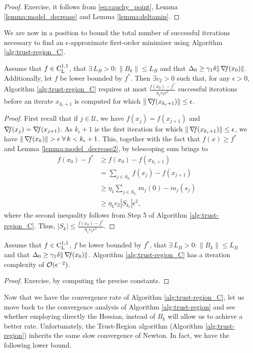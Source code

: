 \documentclass[10pt,a4paper]{article}
\begin{document}
\begin{proof}
	Exercise, it follows from \eqref{eq:cauchy_point}, Lemma \ref{lemma:model_decrease} and Lemma \ref{lemma:deltamin}.
\end{proof}

\noindent We are now in a position to bound the total number of successful iterations necessary to find an $\epsilon$-approximate first-order minimizer using Algorithm \ref{alg:trust-region_C}.

\begin{lemma}
	Assume that $f\in \mathord{\mathrm{C^{1,1}_{L}}}$, that $\exists\, L_B>0: \|B_k\| \leq L_B$ and that $\Delta_0\geq \gamma_1 \delta \|\operatorname*{\mathit{\nabla \!f}}(x_0)\|$. Additionally, let $f$ be lower bounded by $f^*$. Then $\exists c_2>0$ such that, for any $\epsilon > 0$, Algorithm \ref{alg:trust-region_C} requires at most $\frac{f(x_0) - f^*}{\eta_1c_2\epsilon^2}$
	successful iterations before an iterate $x_{k_\epsilon+1}$ is computed for which $\|\operatorname*{\mathit{\nabla \!f}}(x_{k_\epsilon+1})\| \leq \epsilon$.
\end{lemma}
\begin{proof}
First recall that if $j\in \mathcal{U}$, we have $f(x_j) = f(x_{j+1})$ and $\operatorname*{\mathit{\nabla \!f}}(x_j)=\operatorname*{\mathit{\nabla \!f}}(x_{j+1})$. As $k_\epsilon+1$ is the first iteration for which $\|\operatorname*{\mathit{\nabla \!f}}(x_{k_\epsilon+1})\| \leq \epsilon$, we have $\|\grad(x_k)\|>\epsilon \; \forall \, k <k_\epsilon+1$. This, together with the fact that $f(x)\geq f^*$ and Lemma \ref{lemma:model_decrease2}, by telescoping sum brings to 
\begin{align*}
	f(x_0)-f^* &\geq f(x_0) - f(x_{k_\epsilon+1})\\
	& =\sum_{j\in S_{k_\epsilon}} f(x_j) - f(x_{j+1})\\
	& \geq \eta_1 \sum_{j\in S_{k_\epsilon}} m_j(0)- m_j(s_j)\\
	& \geq \eta_1 c_2 |S_{k_\epsilon}| \epsilon^2,
\end{align*}
where the second inequality follows from Step 5 of Algorithm \ref{alg:trust-region_C}. Thus, $|S_k|\leq  \frac{f(x_0) - f^*}{\eta_1c_2 \epsilon^2}.$
\end{proof}

\begin{theorem}
	Assume that $f\in \mathord{\mathrm{C^{1,1}_{L}}}$, $f$ be lower bounded by $f^*$, that $\exists\, L_B>0: \|B_k\| \leq L_B$ and that $\Delta_0\geq \gamma_1 \delta \|\operatorname*{\mathit{\nabla \!f}}(x_0)\|$. Algorithm \ref{alg:trust-region_C} has a iteration complexity of $\mathcal{O}(\epsilon^{-2})$.
\end{theorem}
\begin{proof}
	Exercise, by computing the precise constants.
\end{proof}
Now that we have the convergence rate of Algorithm \ref{alg:trust-region_C}, let us move back to the convergence analysis of Algorithm \ref{alg:trust-region} and see whether employing directly the Hessian, instead of $B_k$ will allow us to achieve a better rate. Unfortunately, the Trust-Region algorithm (Algorithm \ref{alg:trust-region}) inherits the same slow convergence of Newton. In fact, we have the following lower bound.
\end{document}
